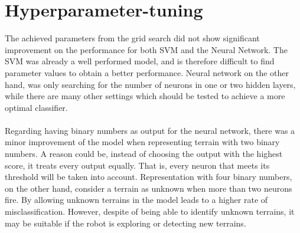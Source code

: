 \documentclass[USenglish]{ifimaster}  %
\begin{document}
\section{Hyperparameter-tuning}
The achieved parameters from the grid search did not show significant improvement on the performance for both SVM and the Neural Network. The SVM was already a well performed model, and is therefore difficult to find parameter values to obtain a better performance. Neural network on the other hand, was only searching for the number of neurons in one or two hidden layers, while there are many other settings which should be tested to achieve a more optimal classifier. 
\\
\\
Regarding having binary numbers as output for the neural network, there was a minor improvement of the model when representing terrain with two binary numbers. A reason could be, instead of choosing the output with the highest score, it treats every output equally. That is, every neuron that meets its threshold will be taken into account. Representation with four binary numbers, on the other hand, consider a terrain as unknown when more than two neurons fire. By allowing unknown terrains in the model leads to a higher rate of misclassification. However, despite of being able to identify unknown terrains, it may be suitable if the robot is exploring or detecting new terrains.
\end{document}

